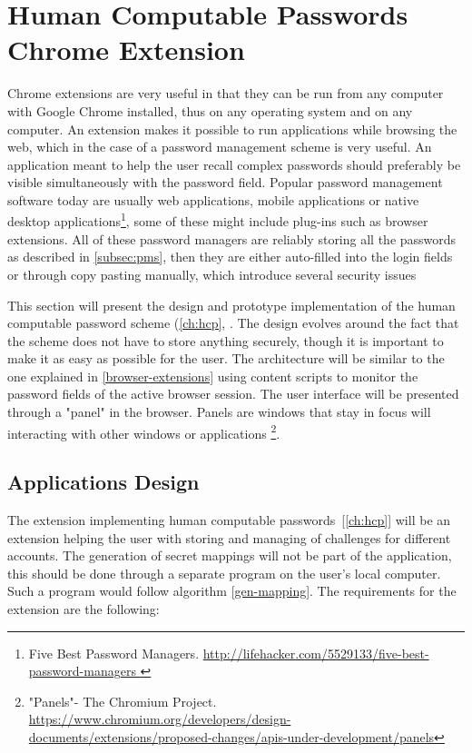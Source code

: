 \section{Human Computable Passwords Chrome Extension}
Chrome extensions are very useful in that they can be run from any computer with Google Chrome installed, thus on any operating system and on any computer. An extension makes it possible to run applications while browsing the web, which in the case of a password management scheme is very useful. An application meant to help the user recall complex passwords should preferably be visible simultaneously with the password field. Popular password management software today are usually web applications, mobile applications or native desktop applications\footnote{Five Best Password Managers. \url{ http://lifehacker.com/5529133/five-best-password-managers }}, some of these might include plug-ins such as browser extensions. All of these password managers are reliably storing all the passwords as described in \autoref{subsec:pms}, then they are either auto-filled into the login fields or through copy pasting manually, which introduce several security issues\cite{protecting-browsers, javascript-injection, chrome-extension-dangers, carlini-chrome, liu-chrome, pw-managment-attacks}
\par This section will present the design and prototype implementation of the human computable password scheme (\autoref{ch:hcp}, \cite{hcp-blocki}. The design evolves around the fact that the scheme does not have to store anything securely, though it is important to make it as easy as possible for the user. The architecture will be similar to the one explained in \autoref{browser-extensions} using content scripts to monitor the password fields of the active browser session. The user interface will be presented through a "panel" in the browser. Panels are windows that stay in focus will interacting with other windows or applications \footnote{"Panels"- The Chromium Project. \url{https://www.chromium.org/developers/design-documents/extensions/proposed-changes/apis-under-development/panels}}.




\subsection{Applications Design}
The extension implementing human computable passwords~[\autoref{ch:hcp}]  will be an extension helping the user with storing and managing of challenges for different accounts. The generation of secret mappings will not be part of the application, this should be done through a separate program on the user's local computer. Such a program would follow algorithm \ref{gen-mapping}. The requirements for the extension are the following:


